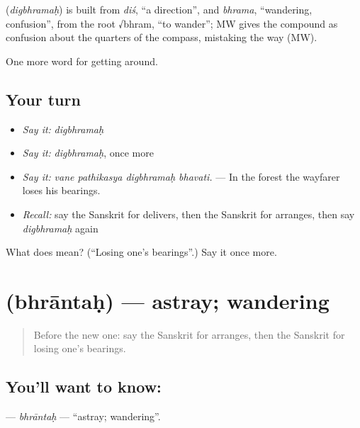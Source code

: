 \begin{cousinweb}
\textbf{} (\emph{digbhramaḥ}) is built from \emph{diś}, \textquotedblleft{}a direction\textquotedblright{}, and \emph{bhrama}, \textquotedblleft{}wandering, confusion\textquotedblright{}, from the root √bhram, \textquotedblleft{}to wander\textquotedblright{}; MW gives the compound as confusion about the quarters of the compass, mistaking the way (MW).
\end{cousinweb}

\begin{grammarlens}[title={What you've built}]
One more word for getting around.
\end{grammarlens}

\subsection*{Your turn}
\begin{itemize}
\raggedright
  \item \emph{Say it:} \emph{digbhramaḥ}
  \item \emph{Say it:} \emph{digbhramaḥ}, once more
  \item \emph{Say it:} \emph{vane pathikasya digbhramaḥ bhavati.} — In the forest the wayfarer loses his bearings.
  \item \emph{Recall:} say the Sanskrit for delivers, then the Sanskrit for arranges, then say \emph{digbhramaḥ} again
\end{itemize}

\begin{tcolorbox}[breakable,colback=teal!4,colframe=teal!35!black,title={Before you move on}]
What does  mean? (\textquotedblleft{}Losing one's bearings\textquotedblright{}.) Say it once more.
\end{tcolorbox}
\section[\texorpdfstring{\sk{भ्रान्तः} (bhrāntaḥ)}{भ्रान्तः (bhrāntaḥ)}]{ (bhrāntaḥ) — astray; wandering}

\label{lesson:SA-C414-bhrantah}



\begin{quote}
Before the new one: say the Sanskrit for arranges, then the Sanskrit for losing one's bearings.
\end{quote}

\subsection*{You'll want to know: }
\textbf{} — \emph{bhrāntaḥ} — \textquotedblleft{}astray; wandering\textquotedblright{}.

